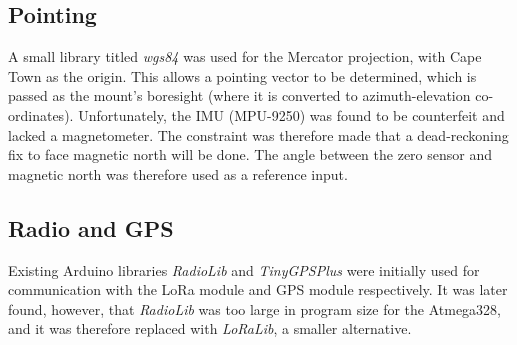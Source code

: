 \subsection{Pointing}
A small library titled \textit{wgs84} was used for the Mercator projection, with Cape Town as the origin. This allows a pointing vector to be determined, which is passed as the mount's boresight (where it is converted to azimuth-elevation co-ordinates). Unfortunately, the IMU (MPU-9250) was found to be counterfeit and lacked a magnetometer. The constraint was therefore made that a dead-reckoning fix to face magnetic north will be done. The angle between the zero sensor and magnetic north was therefore used as a reference input.

\subsection{Radio and GPS}
Existing Arduino libraries \textit{RadioLib} and \textit{TinyGPSPlus} were initially used for communication with the LoRa module and GPS module respectively. It was later found, however, that \textit{RadioLib} was too large in program size for the Atmega328, and it was therefore replaced with \textit{LoRaLib}, a smaller alternative.